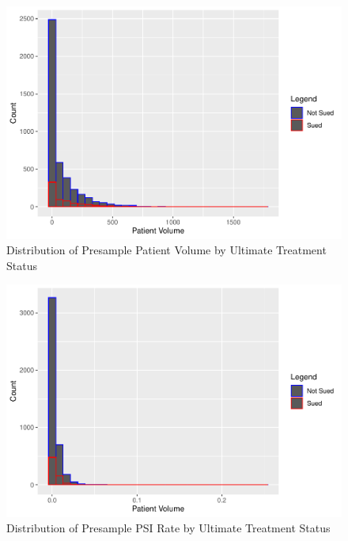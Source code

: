 \documentclass[
  12pt,
]{article}
\begin{document}
\begin{figure}
\centering
\includegraphics{Paper_files/figure-latex/histpatvol-1.pdf}
\caption{\label{fig:histpatvol}Distribution of Presample Patient Volume by Ultimate Treatment Status}
\end{figure}

\FloatBarrier

\begin{figure}
\centering
\includegraphics{Paper_files/figure-latex/histpsi-1.pdf}
\caption{\label{fig:histpsi}Distribution of Presample PSI Rate by Ultimate Treatment Status}
\end{figure}
\end{document}
